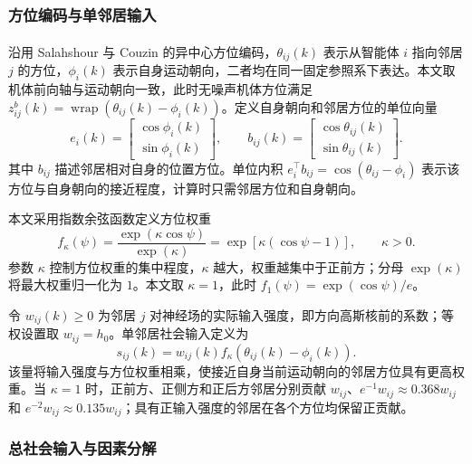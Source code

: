 \documentclass[UTF8,fontset=windows,11pt]{ctexart}
\newcommand{\upcite}[1]{\textsuperscript{\cite{#1}}}
\begin{document}
\subsubsection{方位编码与单邻居输入}

沿用 Salahshour 与 Couzin 的异中心方位编码\upcite{Salahshour2025}，$\theta_{ij}(k)$ 表示从智能体 $i$ 指向邻居 $j$ 的方位，$\phi_i(k)$ 表示自身运动朝向，二者均在同一固定参照系下表达。本文取机体前向轴与运动朝向一致，此时无噪声机体方位满足 $z^b_{ij}(k)=\operatorname{wrap}(\theta_{ij}(k)-\phi_i(k))$。定义自身朝向和邻居方位的单位向量
\begin{equation}
 e_i(k)=\begin{bmatrix}\cos\phi_i(k)\\\sin\phi_i(k)\end{bmatrix},
 \qquad
 b_{ij}(k)=\begin{bmatrix}\cos\theta_{ij}(k)\\\sin\theta_{ij}(k)\end{bmatrix}.
\end{equation}
其中 $b_{ij}$ 描述邻居相对自身的位置方位。单位内积 $e_i^\top b_{ij}=\cos(\theta_{ij}-\phi_i)$ 表示该方位与自身朝向的接近程度，计算时只需邻居方位和自身朝向。

本文采用指数余弦函数定义方位权重
\begin{equation}
 f_\kappa(\psi)
 =\frac{\exp(\kappa\cos\psi)}{\exp(\kappa)}
 =\exp\!\left[\kappa(\cos\psi-1)\right],\qquad\kappa>0.
 \label{eq:exponential_bearing_weight}
\end{equation}
参数 $\kappa$ 控制方位权重的集中程度，$\kappa$ 越大，权重越集中于正前方；分母 $\exp(\kappa)$ 将最大权重归一化为 $1$。本文取 $\kappa=1$，此时 $f_1(\psi)=\exp(\cos\psi)/e$。

令 $w_{ij}(k)\geq0$ 为邻居 $j$ 对神经场的实际输入强度，即方向高斯核前的系数；等权设置取 $w_{ij}=h_0$。单邻居社会输入定义为
\begin{equation}
 \boxed{s_{ij}(k)=w_{ij}(k)f_\kappa\!\left(\theta_{ij}(k)-\phi_i(k)\right).}
 \label{eq:single_social_input}
\end{equation}
该量将输入强度与方位权重相乘，使接近自身当前运动朝向的邻居方位具有更高权重。当 $\kappa=1$ 时，正前方、正侧方和正后方邻居分别贡献 $w_{ij}$、$e^{-1}w_{ij}\approx0.368w_{ij}$ 和 $e^{-2}w_{ij}\approx0.135w_{ij}$；具有正输入强度的邻居在各个方位均保留正贡献。

\subsubsection{总社会输入与因素分解}
\end{document}
